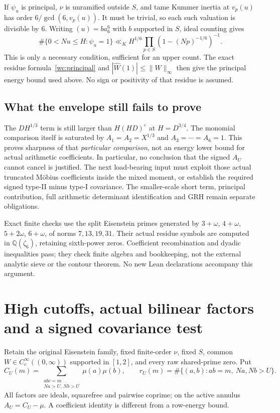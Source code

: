 \documentclass[11pt,oneside,openany]{book}
\theoremstyle{definition}\newtheorem{definition}[theorem]{Definition}
\theoremstyle{remark}\newtheorem{remark}[theorem]{Remark}
\begin{document}
If $\psi_u$ is principal, $\nu$ is unramified outside $S$, and tame
Kummer inertia at $v_p(u)$ has order $6/\gcd(6,v_p(u))$.
It must be trivial, so each such valuation is divisible by $6$.
Writing $(u)=ba_6^6$ with $b$ supported in $S$, ideal counting gives
\[
 \#\{0<Nu\le H:\psi_u=1\}
 \ll_K H^{1/6}\prod_{p\in S}(1-(Np)^{-1/6})^{-1}.
\]
This is only a necessary condition, sufficient for an upper count.
The exact residue formula~\eqref{wc:principal} and
$|\widehat W(1)|\le\|W\|_\infty$ then give the principal energy
bound used above. No sign or positivity of that residue is assumed.

\subsection{What the envelope still fails to prove}
The $DH^{1/3}$ term is still larger than $H(HD)^\varepsilon$ at
$H=D^{3/4}$. The monomial comparison itself is saturated by
$A_1=A_2=X^{1/3}$ and $A_3=\cdots=A_6=1$.
This proves sharpness of that \emph{particular comparison}, not an
energy lower bound for actual arithmetic coefficients. In particular,
no conclusion that the signed $A_U$ cannot cancel is justified.
The next load-bearing input must exploit those actual truncated M\"obius
coefficients inside the mixed moment, or establish the required signed
type-II minus type-I covariance. The smaller-scale short term, principal
contribution, full arithmetic determinant identification and GRH remain
separate obligations.

Exact finite checks use the split Eisenstein primes generated by
$3+\omega$, $4+\omega$, $5+2\omega$, $6+\omega$, of norms
$7,13,19,31$. Their actual residue symbols are computed in
$\mathbb Q(\zeta_6)$, retaining sixth-power zeros. Coefficient
recombination and dyadic inequalities pass; they check finite algebra
and bookkeeping, not the external analytic sieve or the contour theorem.
No new Lean declarations accompany this argument.


\section{High cutoffs, actual bilinear factors and a signed covariance test}\label{sb:core}
Retain the original Eisenstein family, fixed finite-order $\nu$, fixed $S$,
common $W\in C_c^\infty((0,\infty))$ supported in $[1,2]$, and every raw
shared-prime zero. Put
\[
 C_U(m)=\sum_{\substack{abc=m\\Na>U,\,Nb>U}}\mu(a)\mu(b),\qquad
 r_U(m)=\#\{(a,b):ab=m,\ Na,Nb>U\}.
\]
All factors are ideals, squarefree and pairwise coprime; on the active
annulus $A_U=C_U-\mu$. A coefficient identity is different from a row-energy bound.
\end{document}
